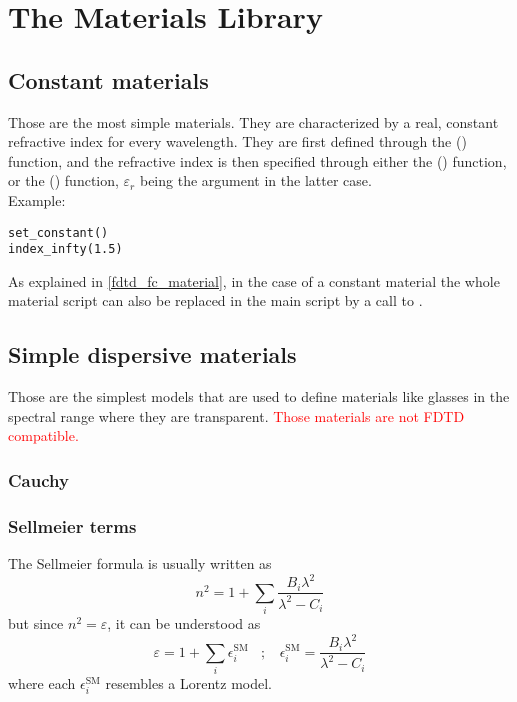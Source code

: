 \chapter{The Materials Library}
\label{matsection}

\section{Constant materials}

Those are the most simple materials. They are characterized by a real, constant refractive index for every wavelength. They are first defined through the () function, and the refractive index is then specified through either the () function, or the () function, $\varepsilon_r$ being the argument in the latter case.\\ Example:

\begin{lstlisting}
set_constant()
index_infty(1.5)
\end{lstlisting}

As explained in \ref{fdtd_fc_material}, in the case of a constant material the whole material script can also be replaced in the main script by a call to .

\section{Simple dispersive materials}

Those are the simplest models that are used to define materials like glasses in the spectral range where they are transparent. \textcolor{red}{Those materials are not FDTD compatible.}

\subsection{Cauchy}

\subsection{Sellmeier terms}

The Sellmeier formula is usually written as
\begin{equation}
	n^2=1+\sum_i \frac{B_i \lambda^2}{\lambda^2-C_i}
\end{equation}
but since $n^2=\varepsilon$, it can be understood as 
\begin{equation}
	\varepsilon=1+\sum_i \epsilon^\textrm{SM}_i ~~~~ ; ~~~~ \epsilon^\textrm{SM}_i=\frac{B_i \lambda^2}{\lambda^2-C_i}
\end{equation}
where each $\epsilon^\textrm{SM}_i$ resembles a Lorentz model.


